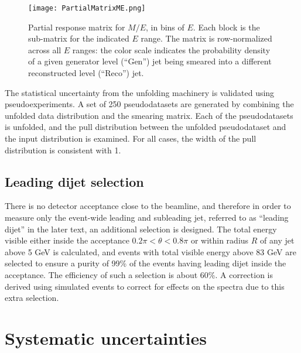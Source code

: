 \documentclass[aps,preprint,superscriptaddress,groupedaddress]{revtex4}  %
\newcommand{\fixme}[1]{{\color{red} [\textbf{#1}]}}
\begin{document}
%
\begin{figure*}
    \centering
    \texttt{[image: PartialMatrixME.png]}
    \caption{Partial response matrix for $M/E$, in bins of $E$.  Each block is the sub-matrix for the indicated $E$ range.  The matrix is row-normalized across all $E$ ranges: the color scale indicates the probability density of a given generator level (``Gen'') jet being smeared into a different reconstructed level (``Reco'') jet.}
    \label{Figure:ResponseJetME}
\end{figure*}


The statistical uncertainty from the unfolding machinery is validated using pseudoexperiments.  A set of 250 pseudodatasets are generated by combining the unfolded data distribution and the smearing matrix.  Each of the pseudodatasets is unfolded, and the pull distribution between the unfolded pseudodataset and the input distribution is examined.  For all cases, the width of the pull distribution is consistent with 1.


\subsection{Leading dijet selection}

There is no detector acceptance close to the beamline, and therefore in order to measure only the event-wide leading and subleading jet, referred to as ``leading dijet'' in the later text, an additional selection is designed.  The total energy visible either inside the acceptance $0.2\pi < \theta < 0.8\pi$ or within radius $R$ of any jet above 5 GeV is calculated, and events with total visible energy above 83 GeV are selected to ensure a purity of 99\% of the events having leading dijet inside the acceptance.  The efficiency of such a selection is about 60\%.  A correction is derived using simulated events to correct for effects on the spectra due to this extra selection.


\section{\label{Section:Systematics}Systematic uncertainties}
\end{document}
